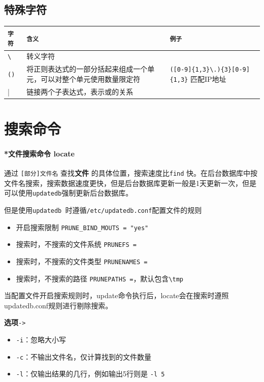 \documentclass[UTF8,a4paper,12pt]{ctexbook}
\begin{document}
		\subsection{特殊字符}
			\begin{table}[H]
				\centering
				\begin{tabular}{l|m{8cm}|m{7cm}}
					\hline
					\verb|字符 |   	   & \verb|含义| & \verb|例子|\\
					\hline
					\verb|\ |   	   & 转义字符  & 	\\
					\verb|() |   	   & 将正则表达式的一部分括起来组成一个单元，可以对整个单元使用数量限定符&  \verb|([0-9]{1,3}\.){3}[0-9]{1,3}| 匹配IP地址\\
					|   	   & 链接两个子表达式，表示或的关系 &  \\
					\hline
				\end{tabular}
			\end{table}		
	\section{搜索命令}
		\paragraph{*文件搜索命令 locate} 通过 \verb|[部分]文件名| 查找\textbf{文件} 的具体位置，搜索速度比\verb|find| 快。在后台数据库中按文件名搜索，搜索数据速度更快，但是后台数据库更新一般是1天更新一次，但是可以使用\verb|updatedb|强制更新后台数据库。
		
			但是使用\verb|updatedb |时遵循\verb|/etc/updatedb.conf|配置文件的规则
			\begin{itemize}[itemindent = 1em]
				\item 开启搜索限制 \verb|PRUNE_BIND_MOUTS = "yes"|
				\item 搜索时，不搜索的文件系统 \verb|PRUNEFS = |
				\item 搜索时，不搜索的文件类型 \verb|PRUNENAMES = |
				\item 搜索时，不搜索的路径 \verb|PRUNEPATHS =|，默认包含\verb|\tmp| 
			\end{itemize}
			
			当配置文件开启搜索规则时，update命令执行后，locate会在搜索时遵照updatedb.conf规则进行剔除搜索。
			
			\textbf{选项}\verb|->|
			\begin{itemize}[itemindent = 1em]
				\item \verb|-i|：忽略大小写
				\item \verb|-c|：不输出文件名，仅计算找到的文件数量
				\item \verb|-l|：仅输出结果的几行，例如输出5行则是 \verb|-l 5|
			\end{itemize}
		
\end{document}
